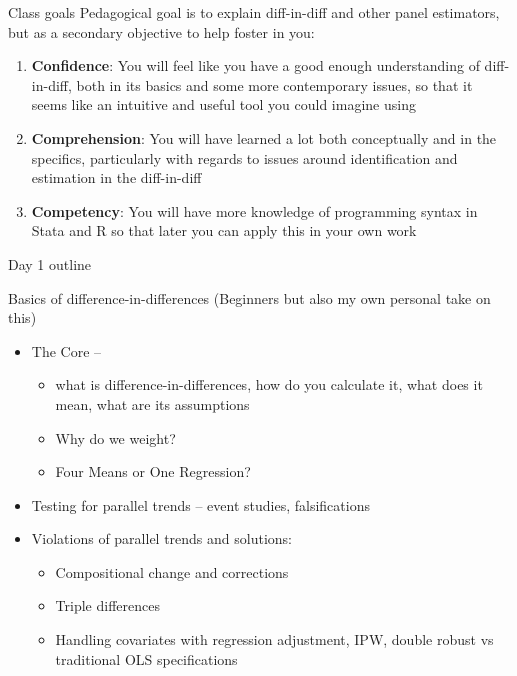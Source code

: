 \documentclass{beamer}
\begin{document}
\begin{frame}{Class goals}
Pedagogical goal is to explain diff-in-diff and other panel estimators, but as a secondary objective to help foster in you:

  \begin{enumerate}
    \item \textbf{Confidence}: You will feel like you have a good enough understanding of diff-in-diff, both in its basics and some more contemporary issues, so that it seems like an intuitive and useful tool you could imagine using
    \item \textbf{Comprehension}: You will have learned a lot both conceptually and in the specifics, particularly with regards to issues around identification and estimation in the diff-in-diff 
    \item \textbf{Competency}: You will have more knowledge of programming syntax in Stata and R so that later you can apply this in your own work
  \end{enumerate}

\end{frame}



\begin{frame}{Day 1 outline}

Basics of difference-in-differences (Beginners but also my own personal take on this)
	\begin{itemize}
	\item The Core -- 
		\begin{itemize}
		\item what is difference-in-differences, how do you calculate it, what does it mean, what are its assumptions
		\item Why do we weight?
		\item Four Means or One Regression?
		\end{itemize}
	\item Testing for parallel trends -- event studies, falsifications
	\item Violations of parallel trends and solutions:
		\begin{itemize}
		\item Compositional change and corrections
		\item Triple differences
		\item Handling covariates with regression adjustment, IPW, double robust vs traditional OLS specifications
		\end{itemize}
	\end{itemize}

\end{frame}
\end{document}
